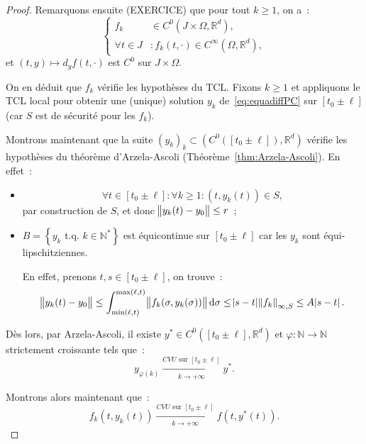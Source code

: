 \documentclass{report}
\theoremstyle{definition}
\theoremstyle{remark}
\numberwithin{equation}{section}
\newcommand{\R}{\mathbb R}
\newcommand{\N}{\mathbb N}
\newcommand{\Ns}{\N^{*}}
\newcommand{\tq}{\text{ t.q. }}
\newcommand{\CONV}[5]{\xrightarrow[#2 \to #3]{#4 \text{ #5 } #1}}
\newcommand{\CVU}[3]{\CONV{#1}{#2}{#3}{CVU}{sur}}
\newcommand{\pinfty}{{+\infty}}
\begin{document}
\begin{proof}
		Remarquons ensuite (EXERCICE) que pour tout $k \geq 1$, on a~:
		\begin{equation}
			\begin{cases}
			f_k &\in C^0(J \times \Omega, \R^d), \\
			\forall t \in J &: f_k(t, \cdot) \in C^\infty(\Omega, \R^d),
		\end{cases}
		\end{equation}
		et $(t, y) \mapsto d_yf(t, \cdot)$ est $C^0$ sur $J \times \Omega$.

		On en déduit que $f_k$ vérifie les hypothèses du TCL. Fixons $k \geq 1$ et appliquons le TCL local pour obtenir une (unique) solution $y_k$
		de~\eqref{eq:equadiffPC} sur $[t_0 \pm \ell]$ (car $S$ est de sécurité pour les $f_k$).

		Montrons maintenant que la suite $(y_k)_k \subset \left(C^0\left([t_0 \pm \ell]\right), \R^d\right)$ vérifie les hypothèses du théorème d'Arzela-Ascoli
		(Théorème~\ref{thm:Arzela-Ascoli}). En effet~:
		\begin{itemize}
			\item
				\begin{equation}
					\forall t \in [t_0 \pm \ell] : \forall k \geq 1 : \left(t, y_k(t)\right) \in S,
				\end{equation}
			par construction de $S$, et donc $\norm {y_k(t) - y_0} \leq r$~;

			\item $B = \left\{y_k \tq k \in \Ns\right\}$ est équicontinue sur $[t_0 \pm \ell]$ car les $y_k$ sont équi-lipschitziennes.

			En effet, prenons $t, s \in [t_0 \pm \ell]$, on trouve~:
			\begin{equation}
				\norm {y_k(t) - y_0} \leq \int_{\min(\ell, t)}^{\max(\ell, t)}\norm {f_k(\sigma, y_k(\sigma))}\dif \sigma \leq \abs {s-t}\norm {f_k}_{\infty, S}
				\leq A\abs {s-t}.
			\end{equation}
		\end{itemize}

		Dès lors, par Arzela-Ascoli, il existe $y^* \in C^0([t_0 \pm \ell], \R^d)$ et $\varphi : \N \to \N$ strictement croissante tels que~:
		\begin{equation}
			y_{\varphi(k)} \CVU {[t_0 \pm \ell]}k\pinfty y^*.
		\end{equation}

		Montrons alors maintenant que~:
		\begin{equation}
			f_k\left(t, y_k(t)\right) \CVU {[t_0 \pm \ell]}k\pinfty f\left(t, y^*(t)\right).
		\end{equation}


\end{proof}
\end{document}
